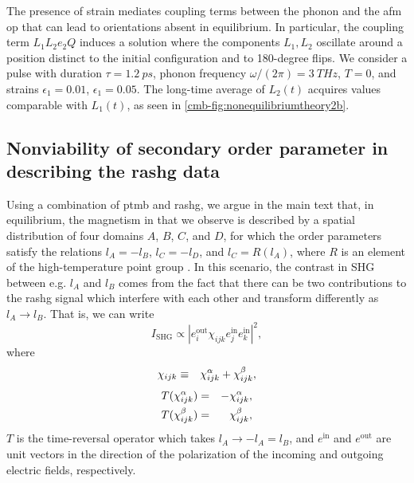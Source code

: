 The presence of strain mediates coupling terms between the phonon and the \gls{afm} \gls{op} that can lead to orientations absent in equilibrium.
In particular, the coupling term $L_1 L_2 e_2 Q$ induces a solution where the components $L_1, L_2$ oscillate around a position distinct to the initial configuration and to 180-degree flips.
We consider a pulse with duration $\tau = \qty{1.2}{ps}$, phonon frequency $\omega/(2\pi) = \qty{3}{THz}$, $T=0$, and strains $\epsilon_1 = 0.01$, $\epsilon_1 = 0.05$.
The long-time average of $L_2(t)$ acquires values comparable with $L_1(t)$, as seen in \cref{cmb-fig:nonequilibriumtheory2b}. 

\subsection{Nonviability of secondary order parameter in describing the \gls{rashg} data}\label{cmb-sec:alternativeinterpretation}

Using a combination of \gls{ptmb} and \gls{rashg}, we argue in the main text that, in equilibrium, the magnetism in \cmb that we observe is described by a spatial distribution of four domains $A$, $B$, $C$, and $D$, for which the order parameters satisfy the relations $l_A = -l_B$, $l_C = -l_D$, and $l_C = R(l_A)$, where $R$ is an element of the high-temperature point group \htpg.
In this scenario, the contrast in SHG between e.g. $l_A$ and $l_B$ comes from the fact that there can be two contributions to the \gls{rashg} signal which interfere with each other and transform differently as $l_A \rightarrow l_B$.
That is, we can write
\begin{equation}\label{cmb-eq:eq1}
I_\mathrm{SHG} \propto |e^\mathrm{out}_i \chi_{ijk} e^\mathrm{in}_j e^\mathrm{in}_k|^2,
\end{equation}
where
\begin{equation}\label{cmb-eq:eq2}
\begin{aligned}
\chi_{ijk} &\equiv &&\chi^\alpha_{ijk} + \chi^\beta_{ijk}, \\
\end{aligned}
\end{equation}
\begin{equation}
\label{cmb-eq:trrelations}
\begin{aligned}
T (\chi^\alpha_{ijk}) &= &-&\chi^\alpha_{ijk}, \\
T (\chi^\beta_{ijk}) &= &&\chi^\beta_{ijk},
\end{aligned}
\end{equation}
$T$ is the time-reversal operator which takes $l_A \rightarrow -l_A = l_B$, and $e^\mathrm{in}$ and $e^\mathrm{out}$ are unit vectors in the direction of the polarization of the incoming and outgoing electric fields, respectively.

